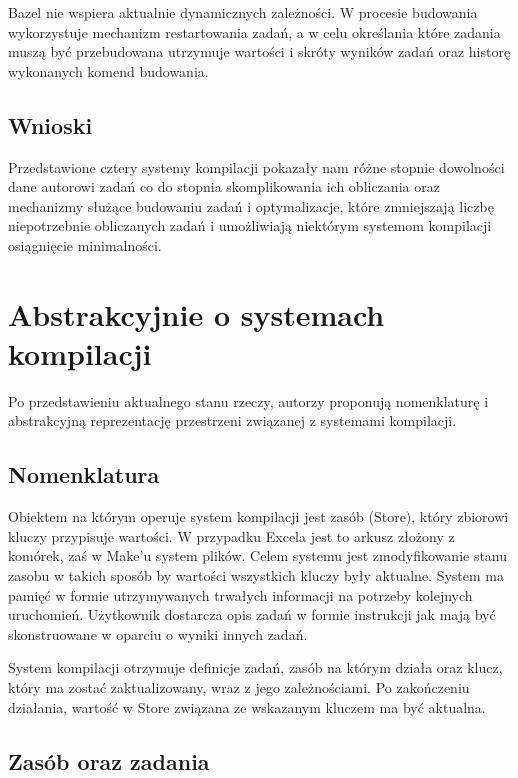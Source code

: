 Bazel nie wspiera aktualnie dynamicznych zależności. W procesie budowania wykorzystuje mechanizm restartowania zadań, a w celu określania które zadania muszą być przebudowana utrzymuje wartości i skróty wyników zadań oraz historę wykonanych komend budowania.

\subsection{Wnioski}

Przedstawione cztery systemy kompilacji pokazały nam różne stopnie dowolności dane autorowi zadań co do stopnia skomplikowania ich obliczania oraz mechanizmy służące budowaniu zadań i optymalizacje, które zmniejszają liczbę niepotrzebnie obliczanych zadań i umożliwiają niektórym systemom kompilacji osiągnięcie minimalności.

\section{Abstrakcyjnie o systemach kompilacji}

Po przedstawieniu aktualnego stanu rzeczy, autorzy proponują nomenklaturę i abstrakcyjną reprezentację przestrzeni związanej z systemami kompilacji.

\subsection{Nomenklatura}

Obiektem na którym operuje system kompilacji jest zasób (Store), który zbiorowi kluczy przypisuje wartości. W przypadku Excela jest to arkusz złożony z komórek, zaś w Make'u system plików. Celem systemu jest zmodyfikowanie stanu zasobu w takich sposób by wartości wszystkich kluczy były aktualne. System ma pamięć w formie utrzymywanych trwałych informacji na potrzeby kolejnych uruchomień. Użytkownik dostarcza opis zadań w formie instrukcji jak mają być skonstruowane w oparciu o wyniki innych zadań.

System kompilacji otrzymuje definicje zadań, zasób na którym działa oraz klucz, który ma zostać zaktualizowany, wraz z jego zależnościami. Po zakończeniu działania, wartość w Store związana ze wskazanym kluczem ma być aktualna.

\subsection{Zasób oraz zadania}

